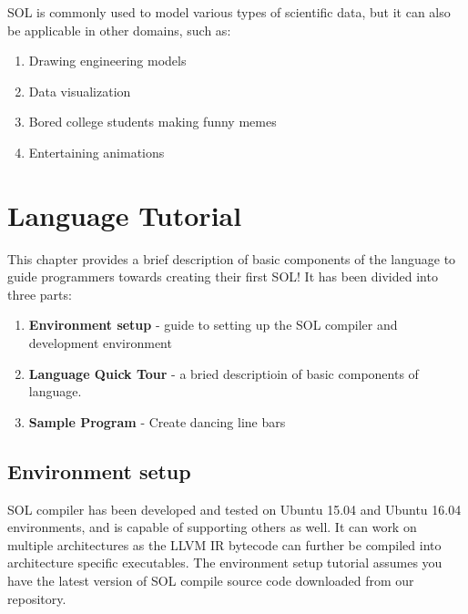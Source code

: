 \documentclass[letterpaper,12pt]{report}
\begin{document}
  SOL is commonly used to model various types of scientific data, but it can also be applicable in other domains, such as:
  \begin{enumerate}
    \itemsep 0em
    \item Drawing engineering models
    \item Data visualization
    \item Bored college students making funny memes
    \item Entertaining animations
  \end{enumerate}

\chapter{Language Tutorial}
  This chapter provides a brief description of basic components of the language to guide programmers towards creating their first SOL! It has been divided into three parts:
  \begin{enumerate}
    \item \textbf{Environment setup} - guide to setting up the SOL compiler and development environment
    \item \textbf{Language Quick Tour} - a bried descriptioin of basic components of language.
    \item \textbf{Sample Program} - Create dancing line bars
  \end{enumerate}

  \section{Environment setup}
  SOL compiler has been developed and tested on Ubuntu 15.04 and Ubuntu 16.04 environments, and is capable of supporting others as well. It can work on multiple architectures as the LLVM IR bytecode can further be compiled into architecture specific executables. The environment setup tutorial assumes you have the latest version of SOL compile source code downloaded from our repository.
\end{document}

